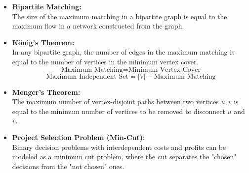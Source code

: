 \begin{itemize}
    \item \textbf{Bipartite Matching:}\\
    The size of the maximum matching in a bipartite graph is equal to the maximum flow in a network constructed from the graph.
    
    \item \textbf{Kőnig's Theorem:}\\
    In any bipartite graph, the number of edges in the maximum matching is equal to the number of vertices in the minimum vertex cover.
    $$ \text{Maximum Matching} = \text{Minimum Vertex Cover} $$
    $$ \text{Maximum Independent Set} = |V| - \text{Maximum Matching} $$

    \item \textbf{Menger's Theorem:}\\
    The maximum number of vertex-disjoint paths between two vertices $u, v$ is equal to the minimum number of vertices to be removed to disconnect $u$ and $v$.
        
    \item \textbf{Project Selection Problem (Min-Cut):}\\
    Binary decision problems with interdependent costs and profits can be modeled as a minimum cut problem, where the cut separates the "chosen" decisions from the "not chosen" ones.
\end{itemize}